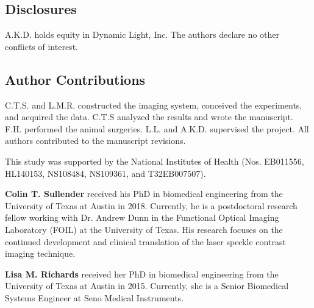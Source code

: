 \documentclass[12pt]{spieman}
\begin{document}
\begin{spacing}{2}
\subsection*{Disclosures}
A.K.D. holds equity in Dynamic Light, Inc. The authors declare no other conflicts of interest.

\subsection*{Author Contributions}
C.T.S. and L.M.R. constructed the imaging system, conceived the experiments, and acquired the data. C.T.S analyzed the results and wrote the manuscript. F.H. performed the animal surgeries. L.L. and A.K.D. supervised the project. All authors contributed to the manuscript revisions.

\acknowledgments
This study was supported by the National Institutes of Health (Nos. EB011556, HL140153, NS108484, NS109361, and T32EB007507).





\vspace{1ex}
\vspace{2ex}\noindent\textbf{Colin T. Sullender} received his PhD in biomedical engineering from the University of Texas at Austin in 2018. Currently, he is a postdoctoral research fellow working with Dr. Andrew Dunn in the Functional Optical Imaging Laboratory (FOIL) at the University of Texas. His research focuses on the continued development and clinical translation of the laser speckle contrast imaging technique.

\vspace{2ex}\noindent\textbf{Lisa M. Richards} received her PhD in biomedical engineering from the University of Texas at Austin in 2015. Currently, she is a Senior Biomedical Systems Engineer at Seno Medical Instruments.


\end{spacing}
\end{document}
